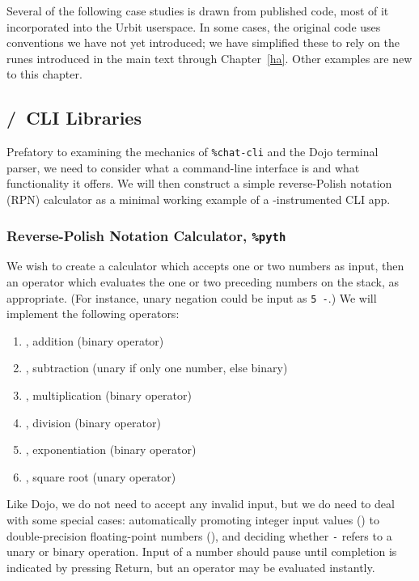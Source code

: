 Several of the following case studies is drawn from published code, most of it incorporated into the Urbit userspace.  In some cases, the original code uses conventions we have not yet introduced; we have simplified these to rely on the runes introduced in the main text through Chapter~\ref{ha}.  Other examples are new to this chapter.

\subsection{\shoe/\sole~CLI Libraries}

Prefatory to examining the mechanics of \texttt{\%chat-cli} and the Dojo terminal parser, we need to consider what a command-line interface is and what functionality it offers.  We will then construct a simple reverse-Polish notation (RPN) calculator as a minimal working example of a \shoe-instrumented CLI app.


\subsubsection{Reverse-Polish Notation Calculator, \texttt{\%pyth}}

We wish to create a calculator which accepts one or two numbers as input, then an operator which evaluates the one or two preceding numbers on the stack, as appropriate.  (For instance, unary negation could be input as \texttt{5 -}.)  We will implement the following operators:

\begin{enumerate}
  \item  \lus, addition (binary operator)
  \item  \hep, subtraction (unary if only one number, else binary)
  \item  \tar, multiplication (binary operator)
  \item  \fas, division (binary operator)
  \item  \ket, exponentiation (binary operator)
  \item  \cab, square root (unary operator)
\end{enumerate}

Like Dojo, we do not need to accept any invalid input, but we do need to deal with some special cases:  automatically promoting integer input values (\patud) to double-precision floating-point numbers (\patrd), and deciding whether \texttt{-} refers to a unary or binary operation.  Input of a number should pause until completion is indicated by pressing Return, but an operator may be evaluated instantly.

